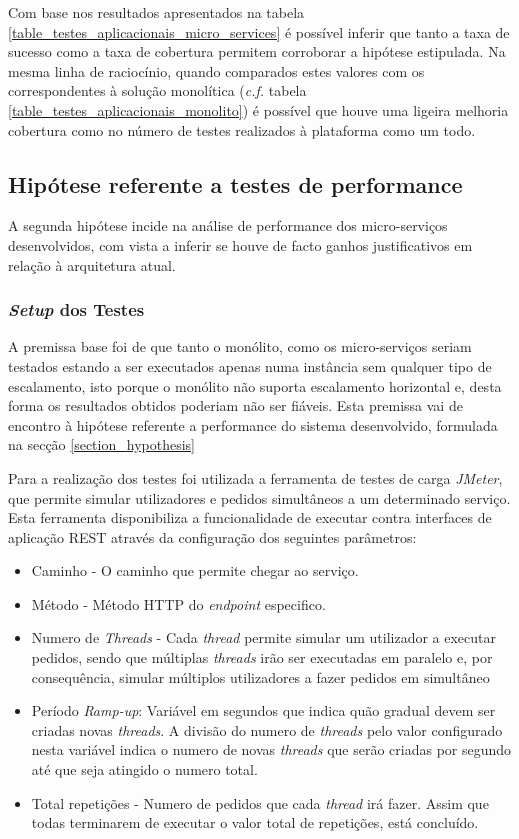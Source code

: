 Com base nos resultados apresentados na tabela \ref{table_testes_aplicacionais_micro_services} é possível inferir que tanto a taxa de sucesso como a taxa de cobertura permitem corroborar a hipótese estipulada. Na mesma linha de raciocínio, quando comparados estes valores com os correspondentes à solução monolítica (\emph{c.f.} tabela \ref{table_testes_aplicacionais_monolito}) é possível que houve uma ligeira melhoria cobertura como no número de testes realizados à plataforma como um todo.

\subsection{Hipótese referente a testes de performance}
A segunda hipótese incide na análise de performance dos micro-serviços desenvolvidos, com vista a inferir se houve de facto ganhos justificativos em relação à arquitetura atual.

\subsubsection{\emph{Setup} dos Testes \label{section_setup_testes}}

A premissa base foi de que tanto o monólito, como os micro-serviços seriam testados estando a ser executados apenas numa instância sem qualquer tipo de escalamento, isto porque o monólito não suporta escalamento horizontal e, desta forma os resultados obtidos poderiam não ser fiáveis. Esta premissa vai de encontro à hipótese referente a performance do sistema desenvolvido, formulada na secção \ref{section_hypothesis}

Para a realização dos testes foi utilizada a ferramenta de testes de carga \emph{JMeter}, que permite simular utilizadores e pedidos simultâneos a um determinado serviço. Esta ferramenta disponibiliza a funcionalidade de executar contra interfaces de aplicação REST através da configuração dos seguintes parâmetros:
\begin{itemize}
    \item Caminho - O caminho que permite chegar ao serviço.
    \item Método - Método HTTP do \emph{endpoint} especifico.
    \item Numero de \emph{Threads} - Cada \emph{thread} permite simular um utilizador a executar pedidos, sendo que múltiplas \emph{threads} irão ser executadas em paralelo e, por consequência, simular múltiplos utilizadores a fazer pedidos em simultâneo
    \item Período \emph{Ramp-up}: Variável em segundos que indica quão gradual devem ser criadas novas \emph{threads}. A divisão do numero de \emph{threads} pelo valor configurado nesta variável indica o numero de novas \emph{threads} que serão criadas por segundo até que seja atingido o numero total.
    \item Total repetições - Numero de pedidos que cada \emph{thread} irá fazer. Assim que todas terminarem de executar o valor total de repetições, está concluído.
\end{itemize}


